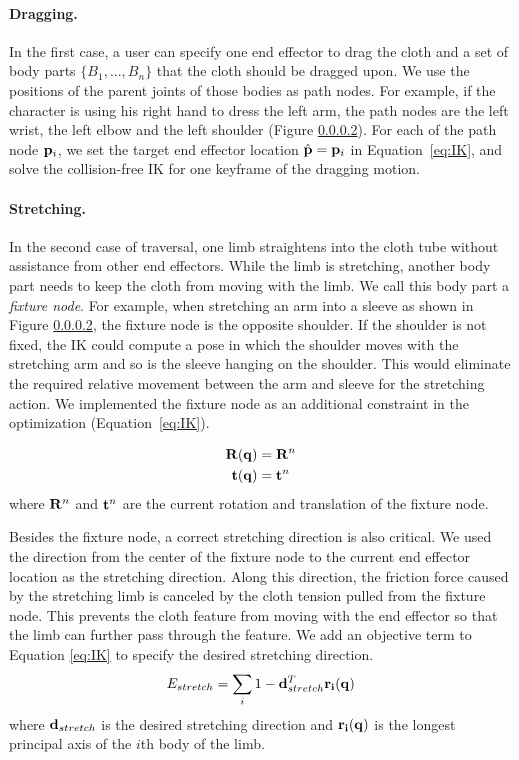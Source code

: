 \paragraph{Dragging.} In the first case, a user can specify one end effector to drag the cloth and a set of body parts $\{B_1 ,..., B_n\}$ that the cloth should be dragged upon. We use the positions of the parent joints of those bodies as path nodes. For example, if the character is using his right hand to dress the left arm, the path nodes are the left wrist, the left elbow and the left shoulder (Figure \ref{}). For each of the path node $\mathbf{p}_i$, we set the target end effector location $\hat{\mathbf{p}}=\mathbf{p}_i$ in Equation~\ref{eq:IK}, and solve the collision-free IK for one keyframe of the dragging motion. 

\paragraph{Stretching.} In the second case of traversal, one limb straightens into the cloth tube without assistance from other end effectors. While the limb is stretching, another body part needs to keep the cloth from moving with the limb. We call this body part a \emph{fixture node}. For example, when stretching an arm into a sleeve as shown in Figure \ref{}, the fixture node is the opposite shoulder. If the shoulder is not fixed, the IK could compute a pose in which the shoulder moves with the stretching arm and so is the sleeve hanging on the shoulder. This would eliminate the required relative movement between the arm and sleeve for the stretching action. We implemented the fixture node as an additional constraint in the optimization (Equation~\ref{eq:IK}).

\begin{align}
  \label{eq:fixtureNode}
  \mathbf{R}(\mathbf{q})& = \mathbf{R}^n\\
  \nonumber  \mathbf{t}(\mathbf{q})& = \mathbf{t}^n
\end{align}
where $\mathbf{R}^n$ and $\mathbf{t}^n$ are the current rotation and translation of the fixture node. 

Besides the fixture node, a correct stretching direction is also critical. We used the direction from the center of the fixture node to the current end effector location as the stretching direction. Along this direction, the friction force caused by the stretching limb is canceled by the cloth tension pulled from the fixture node. This prevents the cloth feature from moving with the end effector so that the limb can further pass through the feature. We add an objective term to Equation \ref{eq:IK} to specify the desired stretching direction.
\begin{equation}
  E_{stretch} = \sum_i1 - \mathbf{d}_{stretch}^T\mathbf{r_i(q)}
  \label{eq:stretching}
\end{equation}
where $\mathbf{d}_{stretch}$ is the desired stretching direction and $\mathbf{r_i(q)}$ is the longest principal axis of the $i$th body of the limb.

